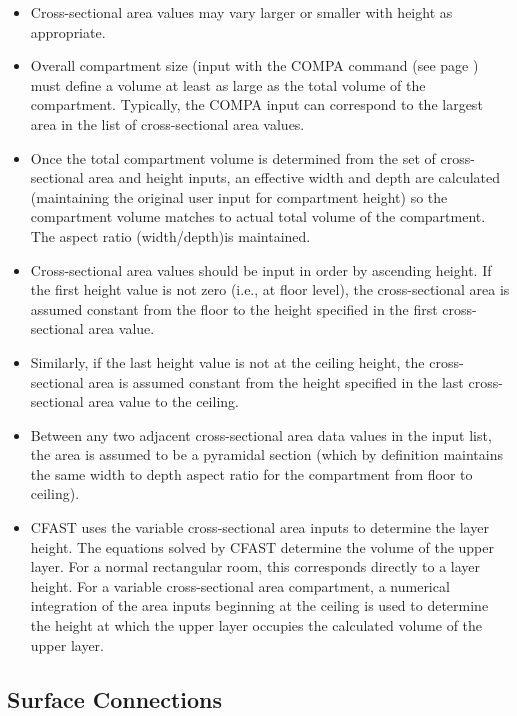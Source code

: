 \begin{itemize}
\item Cross-sectional area values may vary larger or smaller with height as appropriate.
\item Overall compartment size (input with the COMPA command (see page \pageref{Compartment_Inputs}) must define a volume at least as large as the total volume of the compartment. Typically, the COMPA input can correspond to the largest area in the list of cross-sectional area values.
\item Once the total compartment volume is determined from the set of cross-sectional area and height inputs, an effective width and depth are calculated (maintaining the original user input for compartment height) so the compartment volume matches to actual total volume of the compartment. The aspect ratio (width/depth)is maintained.
\item Cross-sectional area values should be input in order by ascending height. If the first height value is not zero (i.e., at floor level), the cross-sectional area is assumed constant from the floor to the height specified in the first cross-sectional area value.
\item Similarly, if the last height value is not at the ceiling height, the cross-sectional area is assumed constant from the height specified in the last cross-sectional area value to the ceiling.
\item Between any two adjacent cross-sectional area data values in the input list, the area is assumed to be a pyramidal section (which by definition maintains the same width to depth aspect ratio for the compartment from floor to ceiling).
\item CFAST uses the variable cross-sectional area inputs to determine the layer height. The equations solved by CFAST determine the volume of the upper layer. For a normal rectangular room, this corresponds directly to a layer height. For a variable cross-sectional area compartment, a  numerical integration of the area inputs beginning at the ceiling is used to determine the height at which the upper layer occupies the calculated volume of the upper layer.
\end{itemize}

\subsection{Surface Connections}

